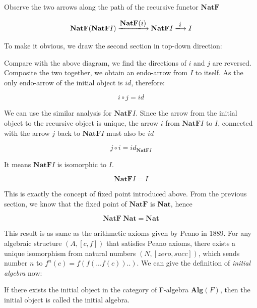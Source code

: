 \documentclass[b5paper]{article}
\begin{document}
Observe the two arrows along the path of the recursive functor $\mathbf{NatF}$

\[
  \mathbf{NatF}(\mathbf{NatF}I) \arrowto{\mathbf{NatF}(i)} \mathbf{NatF} I \arrowto{i} I
\]

To make it obvious, we draw the second section in top-down direction:

\begin{center}
\end{center}

Compare with the above diagram, we find the directions of $i$ and $j$ are reversed. Composite the two together, we obtain an endo-arrow from $I$ to itself. As the only endo-arrow of the initial object is $id$, therefore:

\[
i \circ j = id
\]

We can use the similar analysis for $\mathbf{NatF}I$. Since the arrow from the initial object to the recursive object is unique, the arrow $i$ from $\mathbf{NatF}I$ to $I$, connected with the arrow $j$ back to $\mathbf{NatF}I$ must also be $id$

\[
j \circ i = id_{\mathbf{NatF}I}
\]

It means $\mathbf{NatF}I$ is isomorphic to $I$.

\[
  \mathbf{NatF} I = I
\]

This is exactly the concept of fixed point introduced above. From the previous section, we know that the fixed point of $\mathbf{NatF}$ is $\mathbf{Nat}$, hence

\[
  \mathbf{NatF}\ \mathbf{Nat} = \mathbf{Nat}
\]

This result is as same as the arithmetic axioms given by Peano in 1889. For any algebraic structure $(A, [c, f])$ that satisfies Peano axioms, there exists a unique isomorphism from natural numbers $(N, [zero, succ])$, which sends number $n$ to $f^n(c) = f(f(...f(c))..)$. We can give the definition of {\em initial algebra} now:

\begin{definition}
\normalfont
If there exists the initial object in the category of F-algebra $\pmb{Alg}(F)$, then the initial object is called the initial algebra.
\end{definition}
\end{document}
